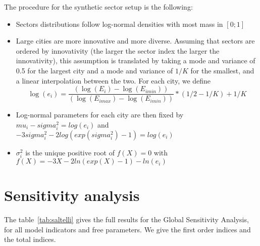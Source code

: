 The procedure for the synthetic sector setup is the following:
\begin{itemize}
    \item Sectors distributions follow log-normal densities with most mass in $\left[0;1\right]$
    \item Large cities are more innovative and more diverse. Assuming that sectors are ordered by innovativity (the larger the sector index the larger the innovativity), this assumption is translated by taking a mode and variance of 0.5 for the largest city and a mode and variance of $1/K$ for the smallest, and a linear interpolation between the two. For each city, we define
    \[
    \log(e_i) = \frac{(\log(E_i) - \log(E_{imin}))}{(\log(E_{imax}) - \log(E_{imin}))} * (1/2 - 1/K) + 1/K
    \]
    \item Log-normal parameters for each city are then fixed by $mu_i - sigma_i^2 = log(e_i)$ and $-3 sigma_i^2 - 2 log(exp(sigma_i^2) - 1) = log(e_i)$
    \item $\sigma_i^2$ is the unique positive root of $f(X)=0$ with $f(X) = -3X - 2 ln(exp(X) - 1) - ln(e_i)$
\end{itemize}






\section*{Sensitivity analysis}

The table~\ref{tab:saltelli} gives the full results for the Global Sensitivity Analysis, for all model indicators and free parameters. We give the first order indices and the total indices.

